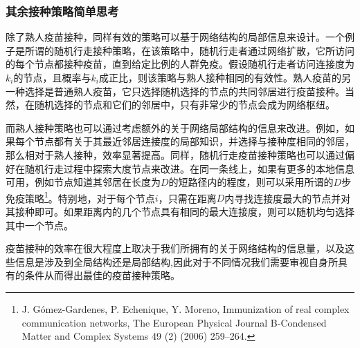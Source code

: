 \documentclass[UTF8]{ctexart}
\begin{document}
\subsubsection{其余接种策略简单思考}
除了熟人疫苗接种，同样有效的策略可以基于网络结构的局部信息来设计。一个例子是所谓的随机行走接种策略，在该策略中，随机行走者通过网络扩散，它所访问的每个节点都接种疫苗，直到给定比例的人群免疫。假设随机行走者访问连接度为$k_{i}$的节点，且概率与$k_{i}$成正比，则该策略与熟人接种相同的有效性。熟人疫苗的另一种选择是普通熟人疫苗，它只选择随机选择的节点的共同邻居进行疫苗接种。当然，在随机选择的节点和它们的邻居中，只有非常少的节点会成为网络枢纽。
\par 而熟人接种策略也可以通过考虑额外的关于网络局部结构的信息来改进。例如，如果每个节点都有关于其最近邻居连接度的局部知识，并选择与接种度相同的邻居，那么相对于熟人接种，效率显著提高。同样，随机行走疫苗接种策略也可以通过偏好在随机行走过程中探索大度节点来改进。在同一条线上，如果有更多的本地信息可用，例如节点知道其邻居在长度为$D$的短路径内的程度，则可以采用所谓的$D$步免疫策略\footnote{J. Gómez-Gardenes, P. Echenique, Y. Moreno, Immunization of real complex communication networks, The European
	Physical Journal B-Condensed Matter and Complex Systems 49 (2) (2006) 259–264.}。特别地，对于每个节点$i$，只需在距离$D$内寻找连接度最大的节点并对其接种即可。如果距离内的几个节点具有相同的最大连接度，则可以随机均匀选择其中一个节点。 
\par 疫苗接种的效率在很大程度上取决于我们所拥有的关于网络结构的信息量，以及这些信息是涉及到全局结构还是局部结构,因此对于不同情况我们需要审视自身所具有的条件从而得出最佳的疫苗接种策略。
\end{document}
